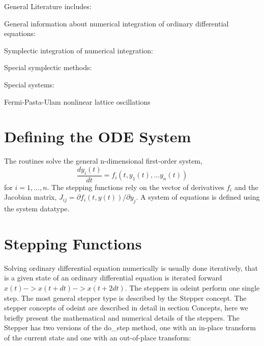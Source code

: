 General Literature includes:

General information about numerical integration of ordinary differential equations: 

\cite{NumericalRecipes_2007}

\cite{Hairer_2009}

\cite{Hairer_2010}



Symplectic integration of numerical integration: 

\cite{Hairer_2006}

\cite{Leimkuhler_2005}



Special symplectic methods: 

\cite{Yoshida_1990}


\cite{McLachlan_1995}




Special systems: 

Fermi-Pasta-Ulam nonlinear lattice oscillations %

\cite{Pikovsky_2001}



\section{Defining the ODE System}
\label{IntroductionODE}

The routines solve the general n-dimensional first-order system,
\begin{equation}
\frac{dy_i(t)}{dt} = f_i(t, y_1(t), . . . y_n(t))
\end{equation}
for $i = 1, . . . , n$. The stepping functions rely on the vector of derivatives $f_i$ and the Jacobian
matrix, $J_{ij} =\partial f_i(t, y(t))/\partial y_j$. A system of equations is defined using the 
system datatype.

\section{Stepping Functions}
\label{SteppingFunctionsODE}

Solving ordinary differential equation numerically is usually done iteratively, that is a given state of an ordinary differential equation is iterated forward $x(t) -> x(t+dt) -> x(t+2dt)$. The steppers in odeint perform one single step. The most general stepper type is described by the Stepper concept. The stepper concepts of odeint are described in detail in section Concepts, here we briefly present the mathematical and numerical details of the steppers. The Stepper has two versions of the do\_step method, one with an in-place transform of the current state and one with an out-of-place transform: 

